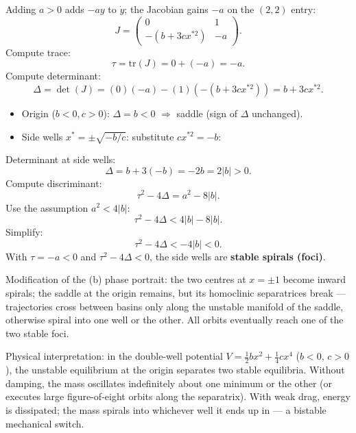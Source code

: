 \documentclass[11pt]{article}
\begin{document}
Adding $a>0$ adds $-ay$ to $\dot y$; the Jacobian gains $-a$ on the $(2,2)$ entry:
\[ J = \begin{pmatrix} 0 & 1 \\ -(b+3cx^{*2}) & -a \end{pmatrix}. \]
Compute trace:
\[ \tau = \text{tr}(J) = 0 + (-a) = -a. \]
Compute determinant:
\[ \Delta = \det(J) = (0)(-a) - (1)(-(b+3cx^{*2})) = b + 3cx^{*2}. \]

\begin{itemize}
\item Origin ($b<0,c>0$): $\Delta = b<0$ $\Rightarrow$ saddle (sign of $\Delta$ unchanged).
\item Side wells $x^*=\pm\sqrt{-b/c}$: substitute $cx^{*2}=-b$:
\end{itemize}
Determinant at side wells:
\[ \Delta = b + 3(-b) = -2b = 2|b| > 0. \]
Compute discriminant:
\[ \tau^2 - 4\Delta = a^2 - 8|b|. \]
Use the assumption $a^2 < 4|b|$:
\[ \tau^2 - 4\Delta < 4|b| - 8|b|. \]
Simplify:
\[ \tau^2 - 4\Delta < -4|b| < 0. \]
With $\tau=-a<0$ and $\tau^2-4\Delta<0$, the side wells are \textbf{stable spirals (foci)}.

Modification of the (b) phase portrait: the two centres at $x=\pm 1$ become inward spirals; the saddle at the origin remains, but its homoclinic separatrices break --- trajectories cross between basins only along the unstable manifold of the saddle, otherwise spiral into one well or the other. All orbits eventually reach one of the two stable foci.

\begin{center}
\end{center}

Physical interpretation: in the double-well potential $V = \tfrac12 b x^2 + \tfrac14 c x^4$ ($b<0$, $c>0$), the unstable equilibrium at the origin separates two stable equilibria. Without damping, the mass oscillates indefinitely about one minimum or the other (or executes large figure-of-eight orbits along the separatrix). With weak drag, energy is dissipated; the mass spirals into whichever well it ends up in --- a bistable mechanical switch.
\end{document}
